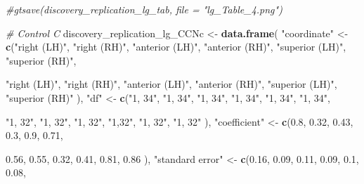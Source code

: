 \documentclass[
]{article}
\newenvironment{Shaded}{\begin{snugshade}}{\end{snugshade}}
\newcommand{\CommentTok}[1]{\textcolor[rgb]{0.56,0.35,0.01}{\textit{#1}}}
\newcommand{\FloatTok}[1]{\textcolor[rgb]{0.00,0.00,0.81}{#1}}
\newcommand{\KeywordTok}[1]{\textcolor[rgb]{0.13,0.29,0.53}{\textbf{#1}}}
\newcommand{\NormalTok}[1]{#1}
\newcommand{\StringTok}[1]{\textcolor[rgb]{0.31,0.60,0.02}{#1}}
\begin{document}
\begin{Shaded}
\begin{Highlighting}[]
\CommentTok{#gtsave(discovery_replication_lg_tab, file = "lg_Table_4.png")}


\CommentTok{# Control C}
\NormalTok{discovery_replication_lg_CCNc <-}\StringTok{ }\KeywordTok{data.frame}\NormalTok{(}
                \StringTok{"coordinate"}\NormalTok{ <-}\StringTok{ }\KeywordTok{c}\NormalTok{(}\StringTok{"right (LH)"}\NormalTok{, }\StringTok{"right (RH)"}\NormalTok{, }\StringTok{"anterior (LH)"}\NormalTok{, }\StringTok{"anterior (RH)"}\NormalTok{, }
                                  \StringTok{"superior (LH)"}\NormalTok{, }\StringTok{"superior (RH)"}\NormalTok{,}
                                  
                                  \StringTok{"right (LH)"}\NormalTok{, }\StringTok{"right (RH)"}\NormalTok{, }\StringTok{"anterior (LH)"}\NormalTok{, }\StringTok{"anterior (RH)"}\NormalTok{, }
                                  \StringTok{"superior (LH)"}\NormalTok{, }\StringTok{"superior (RH)"}
\NormalTok{                                  ),}
                \StringTok{"df"}\NormalTok{ <-}\StringTok{ }\KeywordTok{c}\NormalTok{(}\StringTok{"1, 34"}\NormalTok{, }\StringTok{"1, 34"}\NormalTok{, }\StringTok{"1, 34"}\NormalTok{, }\StringTok{"1, 34"}\NormalTok{, }\StringTok{"1, 34"}\NormalTok{, }\StringTok{"1, 34"}\NormalTok{,}
                          
                          \StringTok{"1, 32"}\NormalTok{, }\StringTok{"1, 32"}\NormalTok{, }\StringTok{"1, 32"}\NormalTok{, }\StringTok{"1,32"}\NormalTok{, }\StringTok{"1, 32"}\NormalTok{, }\StringTok{"1, 32"}
\NormalTok{                          ),}
                \StringTok{"coefficient"}\NormalTok{ <-}\StringTok{ }\KeywordTok{c}\NormalTok{(}\FloatTok{0.8}\NormalTok{, }\FloatTok{0.32}\NormalTok{, }\FloatTok{0.43}\NormalTok{, }\FloatTok{0.3}\NormalTok{, }\FloatTok{0.9}\NormalTok{, }\FloatTok{0.71}\NormalTok{,}
                                   
                                   \FloatTok{0.56}\NormalTok{, }\FloatTok{0.55}\NormalTok{, }\FloatTok{0.32}\NormalTok{, }\FloatTok{0.41}\NormalTok{, }\FloatTok{0.81}\NormalTok{, }\FloatTok{0.86}
\NormalTok{                                   ),}
                \StringTok{"standard error"}\NormalTok{ <-}\StringTok{ }\KeywordTok{c}\NormalTok{(}\FloatTok{0.16}\NormalTok{, }\FloatTok{0.09}\NormalTok{, }\FloatTok{0.11}\NormalTok{, }\FloatTok{0.09}\NormalTok{, }\FloatTok{0.1}\NormalTok{, }\FloatTok{0.08}\NormalTok{,}
                                      

\end{Highlighting}
\end{Shaded}
\end{document}

